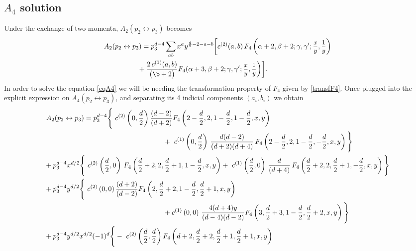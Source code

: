 \documentclass[a4paper,11pt,openright,twoside]{book}
\newcommand{\sdfrac}[2]{\mbox{\small$\displaystyle\frac{#1}{#2}$}}
\numberwithin{equation}{section}
\begin{document}
{{\subsection{$A_4$ solution}
Under the exchange of two momenta, $A_2(p_2\leftrightarrow p_3)$ becomes
\begin{align}
	A_2(p_2\leftrightarrow p_3)&= p_3^{d - 4}\sum_{a b} x^a y^{\frac{d}{2} - 2-a-b}\bigg[c^{(2)}(a,b)\,F_4\left(\alpha +2, \beta+2; \gamma, \gamma'; \sdfrac{x}{y}, \sdfrac{1}{y}\right)\notag\\
	&\hspace{-0.2cm}+ \frac{2\,c^{(1)}(a,b)}{\big(\b+2\big)}F_4(\alpha +3, \beta+2; \gamma, \gamma'; \sdfrac{x}{y}, \sdfrac{1}{y}\bigg)\bigg]. 
\end{align}
In order to solve the equation \eqref{eqA4} we will be needing the transformation property of $F_4$ given by \eqref{transfF4}.
Once plugged into the explicit expression on $A_4(p_2\leftrightarrow p_3)$, and separating its 4 indicial components $(a_i, b_i)$ we obtain
\begin{align}
	A_2(p_2\leftrightarrow p_3)&=p_3^{d-4}\Bigg\{\ c^{(2)}\left(0,\frac{d}{2}\right)\frac{(d-2)}{(d+2)}F_4\left(2-\frac{d}{2},2,1-\frac{d}{2},1-\frac{d}{2},x,y\right)\notag\\
	&\hspace{4cm}+\ c^{(1)}\left(0,\frac{d}{2}\right)\,\frac{d(d-2)}{(d+2)(d+4)}\,F_4\left(2-\frac{d}{2},2,1-\frac{d}{2},-\frac{d}{2},x,y\right)\Bigg\}\notag\\
	&\hspace{-2cm}+p_3^{d-4}x^{d/2}\Bigg\{\ c^{(2)}\left(\frac{d}{2},0\right)\,F_4\left(\frac{d}{2}+2,2,\frac{d}{2}+1,1-\frac{d}{2},x,y\right)+\ c^{(1)}\left(\frac{d}{2},0\right)\,\frac{d}{(d+4)}\,F_4\left(\frac{d}{2}+2,2,\frac{d}{2}+1,-\frac{d}{2},x,y\right)\Bigg\}\notag\\
	&\hspace{-2cm}+p_3^{d-4}y^{d/2}\Bigg\{\ c^{(2)}\left(0,0\right)\frac{(d+2)}{(d-2)}F_4\left(2,\frac{d}{2}+2,1-\frac{d}{2},\frac{d}{2}+1,x,y\right)\notag\\
	&\hspace{4cm}+ c^{(1)}\left(0,0\right)\,\frac{4(d+4)y}{(d-4)(d-2)}F_4\left(3,\frac{d}{2}+3,1-\frac{d}{2},\frac{d}{2}+2,x,y\right)\Bigg\}\notag\\
	&\hspace{-2cm}+p_3^{d-4}y^{d/2}x^{d/2}(-1)^d\Bigg\{-\ c^{(2)}\left(\frac{d}{2},\frac{d}{2}\right)F_4\left(d+2,\frac{d}{2}+2,\frac{d}{2}+1,\frac{d}{2}+1,x,y\right)\,\notag\\

\end{align}}}
\end{document}
